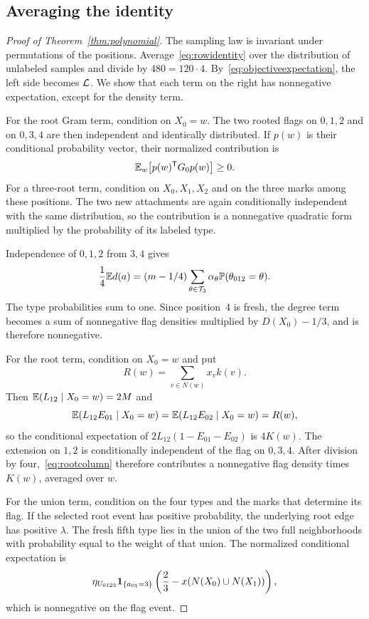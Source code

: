 \subsection{Averaging the identity}
\begin{proof}[Proof of Theorem~\ref{thm:polynomial}]
The sampling law is invariant under permutations of the positions. Average~\eqref{eq:rowidentity} over the distribution of unlabeled samples and divide by $480=120\cdot4$. By~\eqref{eq:objectiveexpectation}, the left side becomes $\mathcal L$. We show that each term on the right has nonnegative expectation, except for the density term.

For the root Gram term, condition on $X_0=w$. The two rooted flags on $0,1,2$ and on $0,3,4$ are then independent and identically distributed. If $p(w)$ is their conditional probability vector, their normalized contribution is
\[
 \mathbb E_w\bigl[p(w)^{\mathsf T}G_0p(w)\bigr]\ge0.
\]
For a three-root term, condition on $X_0,X_1,X_2$ and on the three marks among these positions. The two new attachments are again conditionally independent with the same distribution, so the contribution is a nonnegative quadratic form multiplied by the probability of its labeled type.

Independence of $0,1,2$ from $3,4$ gives
\begin{equation}\label{eq:densityexpectation}
 \frac14\mathbb E d(a)
 =(m-1/4)\sum_{\theta\in\mathcal T_3}
       \alpha_\theta\mathbb P(\theta_{012}=\theta).
\end{equation}
The type probabilities sum to one. Since position~4 is fresh, the degree term becomes a sum of nonnegative flag densities multiplied by $D(X_0)-1/3$, and is therefore nonnegative.

For the root term, condition on $X_0=w$ and put
\[
 R(w)=\sum_{v\in N(w)}x_vk(v).
\]
Then $\mathbb E(L_{12}\mid X_0=w)=2M$ and
\[
 \mathbb E(L_{12}E_{01}\mid X_0=w)
 =\mathbb E(L_{12}E_{02}\mid X_0=w)=R(w),
\]
so the conditional expectation of $2L_{12}(1-E_{01}-E_{02})$ is $4K(w)$. The extension on $1,2$ is conditionally independent of the flag on $0,3,4$. After division by four,~\eqref{eq:rootcolumn} therefore contributes a nonnegative flag density times $K(w)$, averaged over $w$.

For the union term, condition on the four types and the marks that determine its flag. If the selected root event has positive probability, the underlying root edge has positive $\lambda$. The fresh fifth type lies in the union of the two full neighborhoods with probability equal to the weight of that union. The normalized conditional expectation is
\[
 \eta_{U_{0123}}\mathbf 1_{\{a_{01}=3\}}
 \left(\frac23-x(N(X_0)\cup N(X_1))\right),
\]
which is nonnegative on the flag event.


\end{proof}
